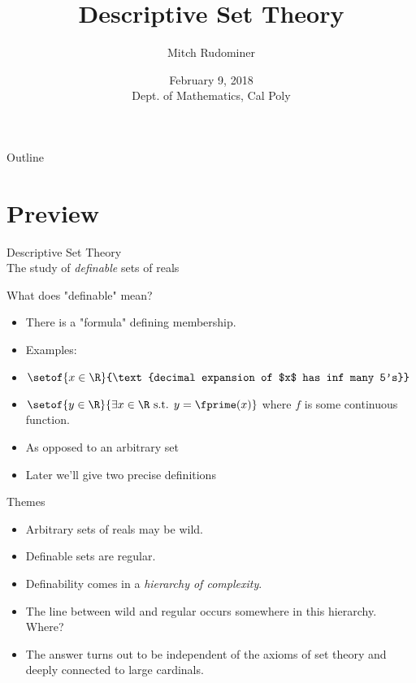 \documentclass{beamer}
\title{Descriptive Set Theory}
\author{Mitch Rudominer}
\institute{Google}
\date
{February 9, 2018 \\ Dept. of Mathematics, Cal Poly }
\begin{document}
\begin{frame}
  \titlepage
\end{frame}

\begin{frame}{Outline}
  \tableofcontents
\end{frame}




\section{Preview}


\begin{frame}{Descriptive Set Theory \\ The study of \emph{definable} sets of reals}

What does "definable" mean?

\pause

  \begin{itemize}
  \item There is a "formula" defining membership.
  \item Examples:
  \item $\setof{x\in\R}{\text{decimal expansion of $x$ has inf many 5's}}$
  \item $\setof{y\in\R}{\exists x\in\R \text{ s.t. } y=\fprime(x)}$ where $f$ is some continuous function.
  \item As opposed to an arbitrary set
  \item Later we'll give two precise definitions
  \end{itemize}


\end{frame}

\begin{frame}{Themes}

  \begin{itemize}
  \item Arbitrary sets of reals may be wild.
  \item Definable sets are regular.
  \item Definability comes in a \emph{hierarchy of complexity}.
  \item The line between wild and regular occurs somewhere in this
  hierarchy. Where?
  \item The answer turns out to be independent of the axioms of set theory
  and deeply connected to large cardinals.
  \end{itemize}
\end{frame}
\end{document}
